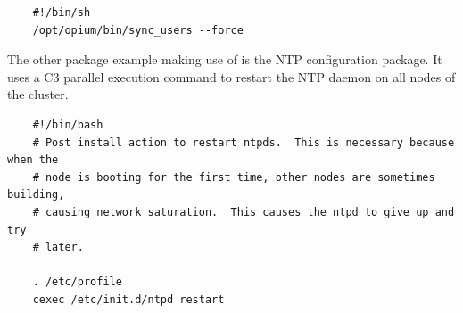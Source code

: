 \begin{scriptsize}
\begin{verbatim}
    #!/bin/sh
    /opt/opium/bin/sync_users --force
\end{verbatim}
\end{scriptsize}


\noindent The other package example making use of  is the
NTP configuration package.  It uses a C3 parallel execution command to
restart the NTP daemon on all nodes of the cluster.

\begin{scriptsize}
\begin{verbatim}
    #!/bin/bash
    # Post install action to restart ntpds.  This is necessary because when the
    # node is booting for the first time, other nodes are sometimes building,
    # causing network saturation.  This causes the ntpd to give up and try
    # later.
  
    . /etc/profile
    cexec /etc/init.d/ntpd restart
\end{verbatim}
\end{scriptsize}
